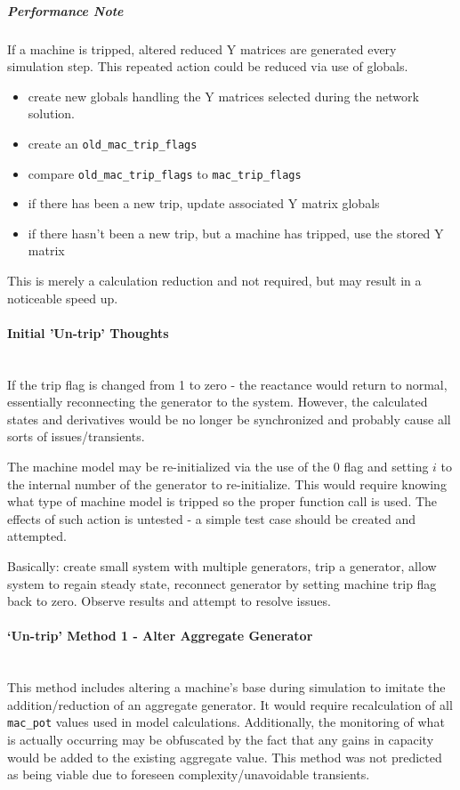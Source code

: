 \documentclass[12pt]{article}
\begin{document}
\subparagraph{Performance Note}
If a machine is tripped, altered reduced Y matrices are generated every simulation step.
This repeated action could be reduced via use of globals.
\begin{itemize}
\item create new globals handling the Y matrices selected during the network solution.
\item create an \verb|old_mac_trip_flags|
\item compare \verb|old_mac_trip_flags| to \verb|mac_trip_flags|
\item if there has been a new trip, update associated Y matrix globals
\item if there hasn't been a new trip, but a machine has tripped, use the stored Y matrix
\end{itemize} 
This is merely a calculation reduction and not required, but may result in a noticeable speed up.

\pagebreak
\paragraph{Initial 'Un-trip' Thoughts} \ \\
If the trip flag is changed from 1 to zero - the reactance would return to normal, essentially reconnecting the generator to the system.
However, the calculated states and derivatives would be no longer be synchronized and probably cause all sorts of issues/transients.

The machine model may be re-initialized via the use of the 0 flag and setting $i$ to the internal number of the generator to re-initialize.
This would require knowing what type of machine model is tripped so the proper function call is used.
The effects of such action is untested - a simple test case should be created and attempted.

Basically:
create small system with multiple generators, trip a generator, allow system to regain steady state, reconnect generator by setting machine trip flag back to zero.
Observe results and attempt to resolve issues.

\paragraph{`Un-trip' Method 1 - Alter Aggregate Generator } \ \\
This method includes altering a machine's base during simulation to imitate the addition/reduction of an aggregate generator.
It would require recalculation of all \verb|mac_pot| values used in model calculations.
Additionally, the monitoring of what is actually occurring may be obfuscated by the fact that any gains in capacity would be added to the existing aggregate value.
This method was not predicted as being viable due to foreseen complexity/unavoidable transients.
\end{document}

